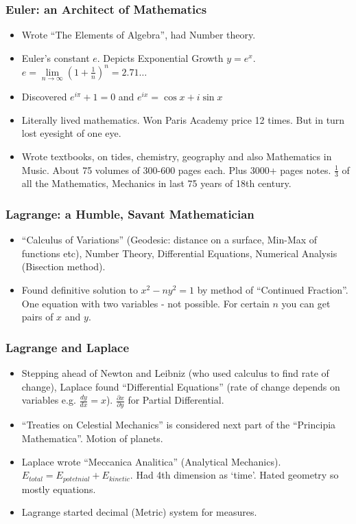 \begin{frame}[fragile]
\frametitle{Euler: an Architect of Mathematics}
\begin{itemize}[label=\textbullet,noitemsep,nolistsep]
\item Wrote ``The Elements of Algebra'', had Number theory.
\item Euler's constant $e$. Depicts Exponential Growth $y=e^x$. $e= \lim \limits_{n \to \infty} (1+\frac{1}{n})^n =2.71\ldots$
\item Discovered $e^{i \pi}+1=0$ and $e^{ix}=\cos{x} + i\sin{x}$
\item Literally lived mathematics. Won Paris Academy price 12 times. But in turn lost eyesight of one eye.
\item Wrote textbooks, on tides, chemistry, geography and also Mathematics in Music. About 75 volumes of 300-600 pages each. Plus 3000+ pages notes. $\frac{1}{3}$ of all the Mathematics, Mechanics in last 75 years of 18th century.
\end{itemize}
\end{frame}


\begin{frame}[fragile]
\frametitle{Lagrange: a Humble, Savant Mathematician}
\begin{itemize}[label=\textbullet,noitemsep,nolistsep]
\item ``Calculus of Variations'' (Geodesic: distance on a surface, Min-Max of functions etc), Number Theory, Differential Equations, Numerical Analysis (Bisection method).
\item Found definitive solution to $x^2-ny^2=1$ by method of ``Continued Fraction''. One equation with two variables - not possible. For certain $n$ you can get pairs of $x$ and $y$.
\end{itemize}
\end{frame}

\begin{frame}[fragile]
\frametitle{Lagrange and Laplace}
\begin{itemize}[label=\textbullet,noitemsep,nolistsep]
\item Stepping ahead of Newton and Leibniz (who used calculus to find rate of change), Laplace found ``Differential Equations'' (rate of change depends on variables e.g. $\frac{dy}{dx}=x$). $\frac{\partial x}{\partial y}$ for Partial Differential.
\item ``Treaties on Celestial Mechanics'' is considered next part of the ``Principia Mathematica''. Motion of planets.
\item Laplace wrote ``Meccanica Analitica'' (Analytical Mechanics). $E_{total} = E_{potetnial} + E_{kinetic}$. Had 4th dimension as `time'. Hated geometry so mostly equations.
\item Lagrange started decimal (Metric) system for measures.
\end{itemize}
\end{frame}

